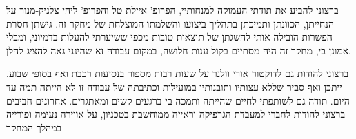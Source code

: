 
ברצוני להביע את תודתי העמוקה למנחותיי, הפרופ' איילת טל והפרופ' ליהי צלניק-מנור על הנחייתן, הכוונתן ותמיכתן בתהליך ביצועו והשלמתו המוצלחת של מחקר זה. גישתן חסרת הפשרות הובילה אותי להשגתן של תוצאות טובות מכפי ששיערתי להעלות בדמיוני, ומבלי אמונן בי, מחקר זה היה מסתיים בקול ענות חלושה, במקום עבודה זא שהינני גאה להציג להלן.

ברצוני להודות גם לדוקטור אורי וולנר על שעות רבות מספור בנסיעות רכבת ואף בסופי שבוע. ייתכן ואף סביר שללא עצותיו ותובנותיו במועילות וכתיבתה של עבודה זו לא הייתה תמה עד היום. 
תודה גם לשותפתי לחיים שהייתה ותמכה בי ברגעים קשים ומאתגרים.
אחרונים חביבים ברצוני להודות לחברי למעבדת הגרפיקה וראייה ממוחשבת בטכניון, על אווירה נעימה ופורייה במהלך המחקר